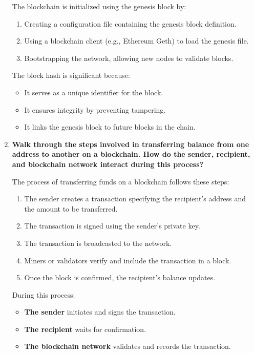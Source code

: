 \documentclass[11pt]{article}
\begin{document}
\begin{enumerate}
    The blockchain is initialized using the genesis block by:
    \begin{enumerate}
        \item Creating a configuration file containing the genesis block definition.
        \item Using a blockchain client (e.g., Ethereum Geth) to load the genesis file.
        \item Bootstrapping the network, allowing new nodes to validate blocks.
    \end{enumerate}

    The block hash is significant because:
    \begin{itemize}
        \item It serves as a unique identifier for the block.
        \item It ensures integrity by preventing tampering.
        \item It links the genesis block to future blocks in the chain.
    \end{itemize}

    \item \textbf{Walk through the steps involved in transferring balance from one address to another on a blockchain. How do the sender, recipient, and blockchain network interact during this process?}
    
    The process of transferring funds on a blockchain follows these steps:
    \begin{enumerate}
        \item The sender creates a transaction specifying the recipient’s address and the amount to be transferred.
        \item The transaction is signed using the sender’s private key.
        \item The transaction is broadcasted to the network.
        \item Miners or validators verify and include the transaction in a block.
        \item Once the block is confirmed, the recipient’s balance updates.
    \end{enumerate}
    
    During this process:
    \begin{itemize}
        \item \textbf{The sender} initiates and signs the transaction.
        \item \textbf{The recipient} waits for confirmation.
        \item \textbf{The blockchain network} validates and records the transaction.
    \end{itemize}


\end{enumerate}
\end{document}
